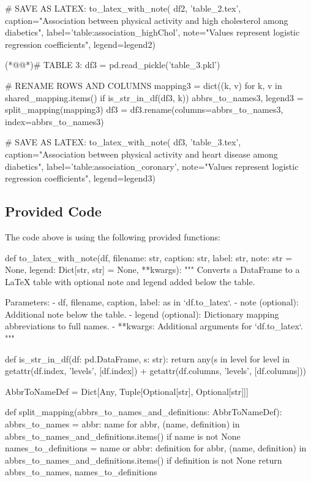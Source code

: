 \documentclass[11pt]{article}
\begin{document}
\begin{python}
# SAVE AS LATEX:
to_latex_with_note(
    df2, 'table_2.tex',
    caption="Association between physical activity and high cholesterol among diabetics", 
    label='table:association_highChol',
    note="Values represent logistic regression coefficients",
    legend=legend2)

(*@@*)# TABLE 3:
df3 = pd.read_pickle('table_3.pkl')

# RENAME ROWS AND COLUMNS 
mapping3 = dict((k, v) for k, v in shared_mapping.items() if is_str_in_df(df3, k)) 
abbrs_to_names3, legend3 = split_mapping(mapping3)
df3 = df3.rename(columns=abbrs_to_names3, index=abbrs_to_names3)

# SAVE AS LATEX:
to_latex_with_note(
    df3, 'table_3.tex',
    caption="Association between physical activity and heart disease among diabetics", 
    label='table:association_coronary',
    note="Values represent logistic regression coefficients",
    legend=legend3)


\end{python}

\subsection{Provided Code}
The code above is using the following provided functions:

\begin{python}
def to_latex_with_note(df, filename: str, caption: str, label: str, note: str = None, legend: Dict[str, str] = None, **kwargs):
    """
    Converts a DataFrame to a LaTeX table with optional note and legend added below the table.

    Parameters:
    - df, filename, caption, label: as in `df.to_latex`.
    - note (optional): Additional note below the table.
    - legend (optional): Dictionary mapping abbreviations to full names.
    - **kwargs: Additional arguments for `df.to_latex`.
    """

def is_str_in_df(df: pd.DataFrame, s: str):
    return any(s in level for level in getattr(df.index, 'levels', [df.index]) + getattr(df.columns, 'levels', [df.columns]))

AbbrToNameDef = Dict[Any, Tuple[Optional[str], Optional[str]]]

def split_mapping(abbrs_to_names_and_definitions: AbbrToNameDef):
    abbrs_to_names = {abbr: name for abbr, (name, definition) in abbrs_to_names_and_definitions.items() if name is not None}
    names_to_definitions = {name or abbr: definition for abbr, (name, definition) in abbrs_to_names_and_definitions.items() if definition is not None}
    return abbrs_to_names, names_to_definitions

\end{python}
\end{document}
